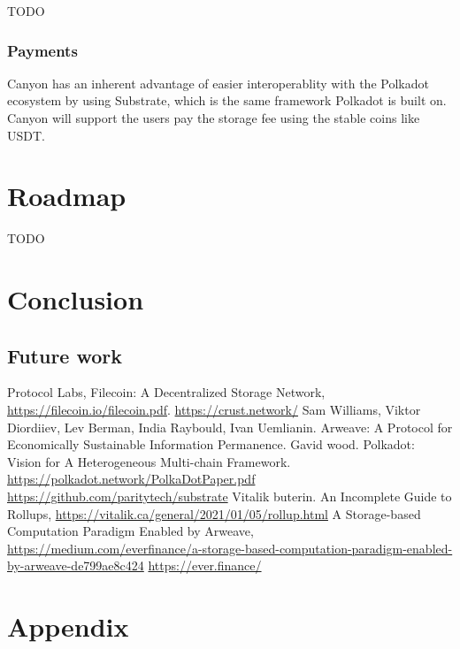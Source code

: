 \documentclass[]{article}
\begin{document}
TODO

\subsubsection{Payments}

Canyon has an inherent advantage of easier interoperablity with the Polkadot ecosystem by using Substrate, which is the same framework Polkadot is built on. Canyon will support the users pay the storage fee using the stable coins like USDT.



\section{Roadmap}

TODO

\section{Conclusion}

\subsection{Future work}

\begin{thebibliography}{99}
Protocol Labs, Filecoin: A Decentralized Storage Network, \url{https://filecoin.io/filecoin.pdf}.
\url{https://crust.network/}
Sam Williams, Viktor Diordiiev, Lev Berman, India Raybould, Ivan Uemlianin. Arweave: A Protocol for Economically Sustainable Information Permanence.
 Gavid wood. Polkadot: Vision for A Heterogeneous Multi-chain Framework. \url{https://polkadot.network/PolkaDotPaper.pdf}
\url{https://github.com/paritytech/substrate}
Vitalik buterin. An Incomplete Guide to Rollups, \url{https://vitalik.ca/general/2021/01/05/rollup.html}
A Storage-based Computation Paradigm Enabled by Arweave, \url{https://medium.com/everfinance/a-storage-based-computation-paradigm-enabled-by-arweave-de799ae8c424}
\url{https://ever.finance/}
\end{thebibliography}

\appendix
\section{Appendix}
\end{document}
